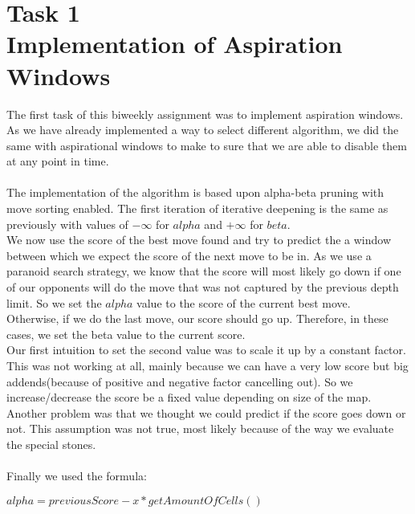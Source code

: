 \section{Task 1 \\ Implementation of Aspiration Windows}
The first task of this biweekly assignment was to implement aspiration windows. As we have already implemented a way to select different algorithm, we did the same with aspirational windows to make to sure that we are able to disable them at any point in time.\\\\
The implementation of the algorithm is based upon alpha-beta pruning with move sorting enabled. The first iteration of iterative deepening is the same as previously with values of $-\infty$ for $alpha$ and $+\infty$ for $beta$.\\
We now use the score of the best move found and try to predict the a window between which we expect the score of the next move to be in. As we use a paranoid search strategy, we know that the score will most likely go down if one of our opponents will do the move that was not captured by the previous depth limit. So we set the $alpha$ value to the score of the current best move.\\ Otherwise, if we do the last move, our score should go up. Therefore, in these cases, we set the beta value to the current score.\\
Our first intuition to set the second value was to scale it up by a constant factor. This was not working at all, mainly because we can have a very low score but big addends(because of positive and negative factor cancelling out). So we increase/decrease the score be a fixed value depending on size of the map. Another problem was that we thought we could predict if the score goes down or not. This assumption was not true, most likely because of the way we evaluate the special stones.\\\\
Finally we used the formula:

$alpha = previousScore - x*getAmountOfCells()$

